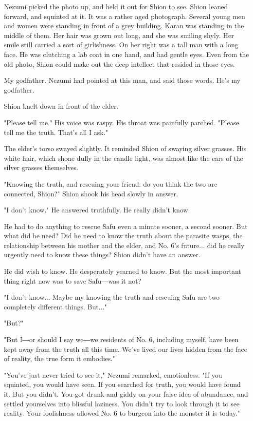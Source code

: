 Nezumi picked the photo up, and held it out for Shion to see. Shion
leaned forward, and squinted at it. It was a rather aged photograph.
Several young men and women were standing in front of a grey building.
Karan was standing in the middle of them. Her hair was grown out long,
and she was smiling shyly. Her smile still carried a sort of
girlishness. On her right was a tall man with a long face. He was
clutching a lab coat in one hand, and had gentle eyes. Even from the old
photo, Shion could make out the deep intellect that resided in those
eyes.

My godfather. Nezumi had pointed at this man, and said those words. He's
my godfather.

Shion knelt down in front of the elder.

"Please tell me." His voice was raspy. His throat was painfully parched.
"Please tell me the truth. That's all I ask."

The elder's torso swayed slightly. It reminded Shion of swaying silver
grasses. His white hair, which shone dully in the candle light, was
almost like the ears of the silver grasses themselves.

"Knowing the truth, and rescuing your friend: do you think the two are
connected, Shion?" Shion shook his head slowly in answer.

"I don't know." He answered truthfully. He really didn't know.

He had to do anything to rescue Safu even a minute sooner, a second
sooner. But what did he need? Did he need to know the truth about the
parasite wasps, the relationship between his mother and the elder, and
No. 6's future... did he really urgently need to know these things?
Shion didn't have an answer.

He did wish to know. He desperately yearned to know. But the most
important thing right now was to save Safu―was it not?

"I don't know... Maybe my knowing the truth and rescuing Safu are two
completely different things. But..."

"But?"

"But I―or should I say we―we residents of No. 6, including myself, have
been kept away from the truth all this time. We've lived our lives
hidden from the face of reality, the true form it embodies."

"You've just never tried to see it," Nezumi remarked, emotionless. "If
you squinted, you would have seen. If you searched for truth, you would
have found it. But you didn't. You got drunk and giddy on your false
idea of abundance, and settled yourselves into blissful laziness. You
didn't try to look through it to see reality. Your foolishness allowed
No. 6 to burgeon into the monster it is today."


